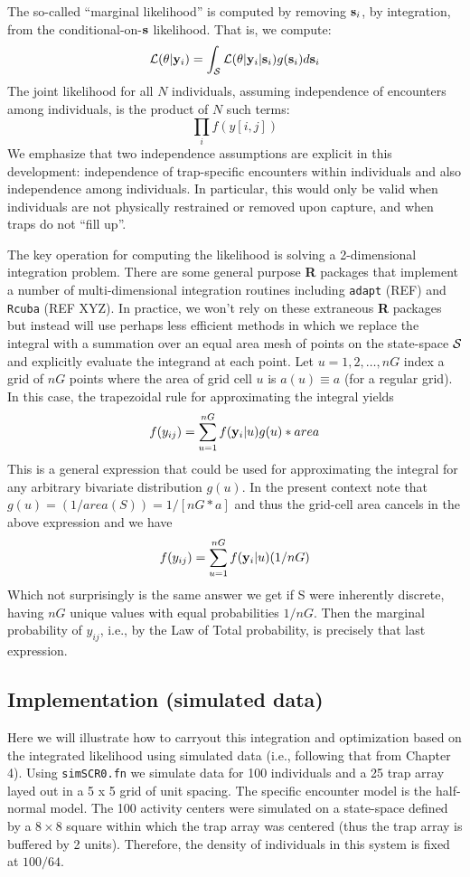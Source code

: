  The so-called ``marginal likelihood'' is computed by removing
${\bf s}_{i}$, by integration, from the conditional-on-${\bf s}$ likelihood. That
is, we compute:
\[
         {\cal L}(\theta| {\bf y}_{i}) = 
\int_{{\cal S}} {\cal L}( \theta | {\bf y}_{i} |{\bf s}_{i}) g({\bf s}_{i}) d{\bf s}_{i}
\]
The joint likelihood for all $N$ individuals, assuming independence of
encounters among individuals, is the product of $N$ such terms:
\[
          \prod_{i}  f(y[i,j])
\]
We emphasize that two independence assumptions are explicit in this
development: independence of trap-specific encounters within
individuals and also independence among individuals. In particular,
this would only be valid when individuals are not physically
restrained or removed upon capture, and when traps do not “fill up”.

The key operation for computing the likelihood is solving a
2-dimensional integration problem. There are some general purpose {\bf
  R} packages that implement a number of 
 multi-dimensional integration routines
including \mbox{\tt adapt} (REF) and \mbox{\tt Rcuba} (REF XYZ). In practice, we won’t rely
on these extraneous {\bf R} packages but instead will use perhaps less
efficient methods in which we replace the integral with a summation
over an equal area mesh of points on the state-space ${\cal S}$ and explicitly
evaluate the integrand at each point. Let $u=1,2,\ldots,nG$ index a grid of
$nG$ points where the area of grid cell $u$ is $a(u) \equiv a$ (for a regular grid).
In this case, the trapezoidal rule
for approximating the integral yields
\[
          f(y_{ij}) = \sum_{u=1}^{nG}  f( {\bold y}_{i} |u) g(u) *area
\]
This is a general expression that could be used
for approximating the integral for any arbitrary bivariate
distribution $g(u)$. In the present context note that $g(u) = (1/area(S))
= 1/[nG*a]$ and thus the grid-cell area cancels in the above
expression and we have
\[
          f(y_{ij}) = \sum_{u=1}^{nG}  f( {\bold y}_{i} |u) (1/nG)
\]
Which not surprisingly is the same answer we get if {\cal S} were inherently
discrete, having $nG$ unique values with equal probabilities $1/nG$. Then
the marginal probability of $y_{ij}$, i.e., by the Law of Total
probability, is precisely that last expression.

\subsection{ Implementation (simulated data)}

Here we will illustrate how to carryout this integration and
optimization based on the integrated likelihood using simulated data
 (i.e., following that from Chapter 4). Using \mbox{\tt simSCR0.fn}
 we simulate data for 100 individuals and a 25 trap array
layed out in a 5 x 5 grid of unit spacing.  The specific encounter
model is the half-normal model. The 100 activity centers were
simulated on a state-space defined by a $8 \times 8$ square 
within which the
trap array was centered (thus the trap array is buffered by 2
units). Therefore, the density of individuals in this system is fixed
at $100/64$.


